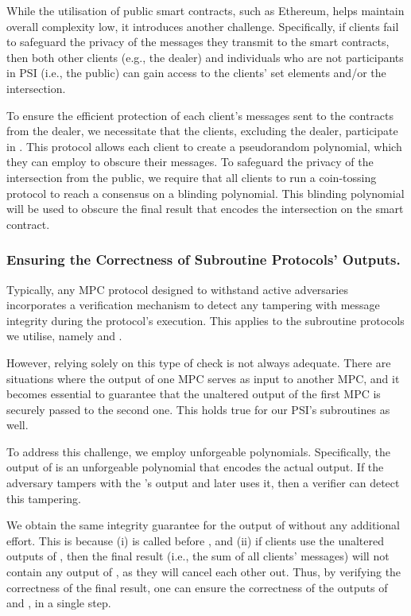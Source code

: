  
 While the utilisation of public smart contracts, such as Ethereum, helps maintain overall complexity low, it introduces another challenge. Specifically, if clients fail to safeguard the privacy of the messages they transmit to the smart contracts, then both other clients (e.g., the dealer) and individuals who are not participants in PSI (i.e., the public) can gain access to the clients' set elements and/or the intersection.
 
 To ensure the efficient protection of each client's messages sent to the contracts from the dealer, we necessitate that the clients, excluding the dealer, participate in \zspaa. This protocol allows each client to create a pseudorandom polynomial, which they can employ to obscure their messages. To safeguard the privacy of the intersection from the public, we require that  all clients to run a coin-tossing protocol to reach a consensus on a blinding polynomial.  This blinding polynomial will be used to obscure the final result that encodes the intersection on the smart contract.  
 
 

 \subsubsection{Ensuring the Correctness of Subroutine Protocols' Outputs.} 
 
 
 Typically, any MPC protocol designed to withstand active adversaries incorporates a verification mechanism to detect any tampering with message integrity during the protocol's execution. This applies to the subroutine protocols we utilise, namely \vopr and \zspaa. 
 
 
  However, relying solely on this type of check is not always adequate. There are situations where the output of one MPC serves as input to another MPC, and it becomes essential to guarantee that the unaltered output of the first MPC is securely passed to the second one. This holds true for our PSI's subroutines as well. 
  
  To address this challenge, we employ unforgeable polynomials. Specifically, the output of \vopr is an unforgeable polynomial that encodes the actual output. If the adversary tampers with the \vopr's output and later uses it, then a verifier can detect this tampering. 
 
 We obtain the same integrity guarantee for the output of \zspaa without any additional effort. This is because (i) \vopr is called before \zspaa, and (ii) if clients use the unaltered outputs of \zspaa, then the final result (i.e., the sum of all clients' messages) will not contain any output of \zspaa, as they will cancel each other out. Thus, by verifying the correctness of the final result, one can ensure the correctness of the outputs of \vopr and \zspaa, in a single step. 





 
